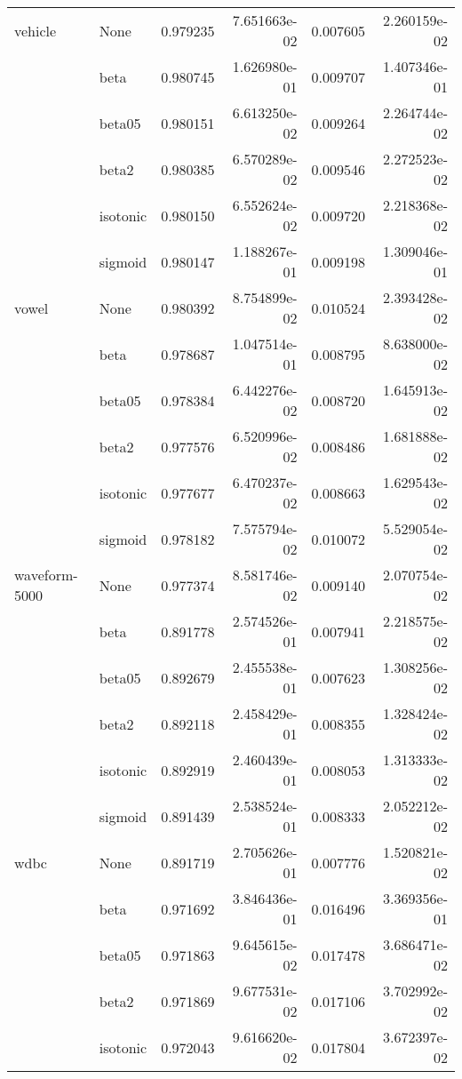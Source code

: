 \begin{tabular}{llrrrr}
vehicle & None &  0.979235 &  7.651663e-02 &  0.007605 &  2.260159e-02 \\
        & beta &  0.980745 &  1.626980e-01 &  0.009707 &  1.407346e-01 \\
        & beta05 &  0.980151 &  6.613250e-02 &  0.009264 &  2.264744e-02 \\
        & beta2 &  0.980385 &  6.570289e-02 &  0.009546 &  2.272523e-02 \\
        & isotonic &  0.980150 &  6.552624e-02 &  0.009720 &  2.218368e-02 \\
        & sigmoid &  0.980147 &  1.188267e-01 &  0.009198 &  1.309046e-01 \\
vowel & None &  0.980392 &  8.754899e-02 &  0.010524 &  2.393428e-02 \\
        & beta &  0.978687 &  1.047514e-01 &  0.008795 &  8.638000e-02 \\
        & beta05 &  0.978384 &  6.442276e-02 &  0.008720 &  1.645913e-02 \\
        & beta2 &  0.977576 &  6.520996e-02 &  0.008486 &  1.681888e-02 \\
        & isotonic &  0.977677 &  6.470237e-02 &  0.008663 &  1.629543e-02 \\
        & sigmoid &  0.978182 &  7.575794e-02 &  0.010072 &  5.529054e-02 \\
waveform-5000 & None &  0.977374 &  8.581746e-02 &  0.009140 &  2.070754e-02 \\
        & beta &  0.891778 &  2.574526e-01 &  0.007941 &  2.218575e-02 \\
        & beta05 &  0.892679 &  2.455538e-01 &  0.007623 &  1.308256e-02 \\
        & beta2 &  0.892118 &  2.458429e-01 &  0.008355 &  1.328424e-02 \\
        & isotonic &  0.892919 &  2.460439e-01 &  0.008053 &  1.313333e-02 \\
        & sigmoid &  0.891439 &  2.538524e-01 &  0.008333 &  2.052212e-02 \\
wdbc & None &  0.891719 &  2.705626e-01 &  0.007776 &  1.520821e-02 \\
        & beta &  0.971692 &  3.846436e-01 &  0.016496 &  3.369356e-01 \\
        & beta05 &  0.971863 &  9.645615e-02 &  0.017478 &  3.686471e-02 \\
        & beta2 &  0.971869 &  9.677531e-02 &  0.017106 &  3.702992e-02 \\
        & isotonic &  0.972043 &  9.616620e-02 &  0.017804 &  3.672397e-02 \\

\end{tabular}
